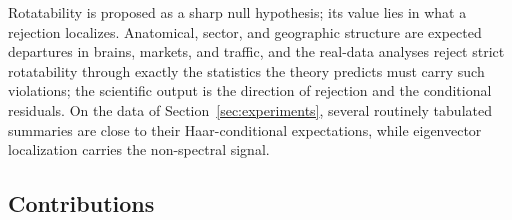 Rotatability is proposed as a sharp null hypothesis; its value lies
in what a rejection localizes. Anatomical, sector, and geographic structure are expected departures
in brains, markets, and traffic, and the real-data analyses reject
strict rotatability through exactly the statistics the theory predicts
must carry such violations; the
scientific output is the direction of rejection and the conditional
residuals. On the data of
Section~\ref{sec:experiments}, several routinely tabulated summaries
are close to their Haar-conditional expectations, while eigenvector
localization carries the non-spectral signal.

\subsection{Contributions}

